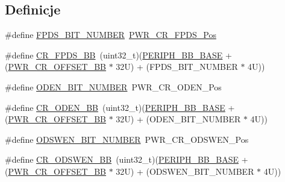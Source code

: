 \subsection*{Definicje}
\begin{DoxyCompactItemize}
\item 
\#define \hyperlink{group___p_w_r_ex__register__alias__address_gab04d9f278c4124285a9591c4f7098019}{F\+P\+D\+S\+\_\+\+B\+I\+T\+\_\+\+N\+U\+M\+B\+ER}~\hyperlink{group___peripheral___registers___bits___definition_gaa7d09308d258629a5feea487cf8746c3}{P\+W\+R\+\_\+\+C\+R\+\_\+\+F\+P\+D\+S\+\_\+\+Pos}
\item 
\#define \hyperlink{group___p_w_r_ex__register__alias__address_ga57d7041b5d1bf0ec94fa18152a7fa208}{C\+R\+\_\+\+F\+P\+D\+S\+\_\+\+BB}~(uint32\+\_\+t)(\hyperlink{group___peripheral__memory__map_gaed7efc100877000845c236ccdc9e144a}{P\+E\+R\+I\+P\+H\+\_\+\+B\+B\+\_\+\+B\+A\+SE} + (\hyperlink{group___p_w_r__register__alias__address_ga387e4e883d6bea5c2223adc42ee72daa}{P\+W\+R\+\_\+\+C\+R\+\_\+\+O\+F\+F\+S\+E\+T\+\_\+\+BB} $\ast$ 32\+U) + (\+F\+P\+D\+S\+\_\+\+B\+I\+T\+\_\+\+N\+U\+M\+B\+E\+R $\ast$ 4\+U))
\item 
\#define \hyperlink{group___p_w_r_ex__register__alias__address_gace51402e8067c2b478e3bcbc6efe0b70}{O\+D\+E\+N\+\_\+\+B\+I\+T\+\_\+\+N\+U\+M\+B\+ER}~P\+W\+R\+\_\+\+C\+R\+\_\+\+O\+D\+E\+N\+\_\+\+Pos
\item 
\#define \hyperlink{group___p_w_r_ex__register__alias__address_ga1ce2817ed3cc064b3577f90cbb23be35}{C\+R\+\_\+\+O\+D\+E\+N\+\_\+\+BB}~(uint32\+\_\+t)(\hyperlink{group___peripheral__memory__map_gaed7efc100877000845c236ccdc9e144a}{P\+E\+R\+I\+P\+H\+\_\+\+B\+B\+\_\+\+B\+A\+SE} + (\hyperlink{group___p_w_r__register__alias__address_ga387e4e883d6bea5c2223adc42ee72daa}{P\+W\+R\+\_\+\+C\+R\+\_\+\+O\+F\+F\+S\+E\+T\+\_\+\+BB} $\ast$ 32\+U) + (\+O\+D\+E\+N\+\_\+\+B\+I\+T\+\_\+\+N\+U\+M\+B\+E\+R $\ast$ 4\+U))
\item 
\#define \hyperlink{group___p_w_r_ex__register__alias__address_gaedd8b85a6ee45b4816a46e7295525d50}{O\+D\+S\+W\+E\+N\+\_\+\+B\+I\+T\+\_\+\+N\+U\+M\+B\+ER}~P\+W\+R\+\_\+\+C\+R\+\_\+\+O\+D\+S\+W\+E\+N\+\_\+\+Pos
\item 
\#define \hyperlink{group___p_w_r_ex__register__alias__address_ga4915f7ce72ac67213c7a5b50bce70d54}{C\+R\+\_\+\+O\+D\+S\+W\+E\+N\+\_\+\+BB}~(uint32\+\_\+t)(\hyperlink{group___peripheral__memory__map_gaed7efc100877000845c236ccdc9e144a}{P\+E\+R\+I\+P\+H\+\_\+\+B\+B\+\_\+\+B\+A\+SE} + (\hyperlink{group___p_w_r__register__alias__address_ga387e4e883d6bea5c2223adc42ee72daa}{P\+W\+R\+\_\+\+C\+R\+\_\+\+O\+F\+F\+S\+E\+T\+\_\+\+BB} $\ast$ 32\+U) + (\+O\+D\+S\+W\+E\+N\+\_\+\+B\+I\+T\+\_\+\+N\+U\+M\+B\+E\+R $\ast$ 4\+U))

\end{DoxyCompactItemize}
